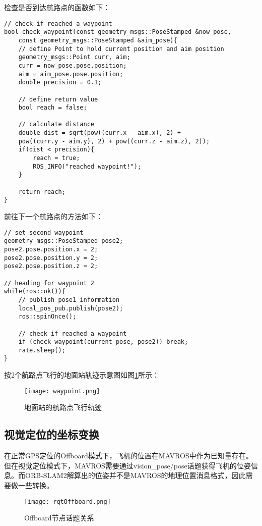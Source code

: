 检查是否到达航路点的函数如下：

\begin{verbatim}
// check if reached a waypoint
bool check_waypoint(const geometry_msgs::PoseStamped &now_pose, 
    const geometry_msgs::PoseStamped &aim_pose){
    // define Point to hold current position and aim position
    geometry_msgs::Point curr, aim;
    curr = now_pose.pose.position;
    aim = aim_pose.pose.position;
    double precision = 0.1;

    // define return value
    bool reach = false;

    // calculate distance
    double dist = sqrt(pow((curr.x - aim.x), 2) +
    pow((curr.y - aim.y), 2) + pow((curr.z - aim.z), 2));
    if(dist < precision){
        reach = true;
        ROS_INFO("reached waypoint!");
    }

    return reach;
}
\end{verbatim}

前往下一个航路点的方法如下：

\begin{verbatim}
// set second waypoint
geometry_msgs::PoseStamped pose2;
pose2.pose.position.x = 2;
pose2.pose.position.y = 2;
pose2.pose.position.z = 2;

// heading for waypoint 2
while(ros::ok()){
    // publish pose1 information
    local_pos_pub.publish(pose2);
    ros::spinOnce();

    // check if reached a waypoint
    if (check_waypoint(current_pose, pose2)) break;
    rate.sleep();
}
\end{verbatim}

按2个航路点飞行的地面站轨迹示意图如图\ref{fig4-3}所示：

\begin{figure}[!ht]
	\centering
	\texttt{[image: waypoint.png]}
	\caption{地面站的航路点飞行轨迹}
	\label{fig4-3}
\end{figure}

\subsection{视觉定位的坐标变换} \label{4.2.3}

在正常GPS定位的Offboard模式下，飞机的位置在MAVROS中作为已知量存在。但在视觉定位模式下，MAVROS需要通过vision\_pose/pose话题获得飞机的位姿信息。而ORB-SLAM2解算出的位姿并不是MAVROS的地理位置消息格式，因此需要做一些转换。

\begin{figure}[!ht]
	\centering
	\texttt{[image: rqtOffboard.png]}
	\caption{Offboard节点话题关系}
	\label{fig4-4}
\end{figure}

